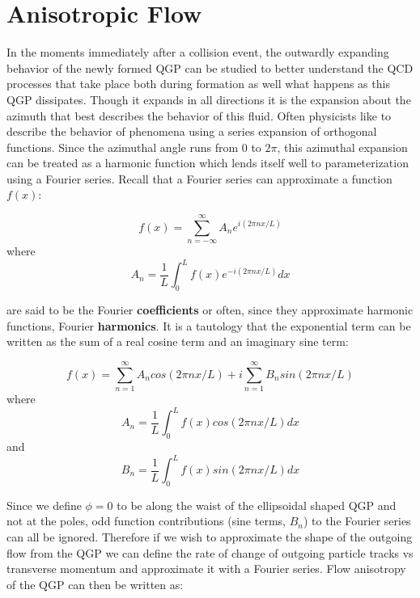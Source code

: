 
\chapter{Anisotropic Flow} %
\label{sect:flow}

In the moments immediately after a collision event, the outwardly expanding behavior of the newly formed QGP can be studied to better understand the QCD processes that take place both during formation as well what happens as this QGP dissipates. Though it expands in all directions it is the expansion about the azimuth that best describes the behavior of this fluid. Often physicists like to describe the behavior of phenomena using a series expansion of orthogonal functions. Since the azimuthal angle runs from $0$ to $2 \pi$, this azimuthal expansion can be treated as a harmonic function which lends itself well to parameterization using a Fourier series. Recall that a Fourier series can approximate a function $f(x)$:

\begin{equation}
f(x) = \sum^{\infty}_{n=-\infty} A_{n} e^{i(2 \pi n x / L)}
\end{equation}
where
\begin{equation}
A_{n} = \frac{1}{L} \int^{L}_{0} f(x) e^{-i(2 \pi n x / L)} dx
\end{equation}

are said to be the Fourier \textbf{coefficients} or often, since they approximate harmonic functions, Fourier \textbf{harmonics}. It is a tautology that the exponential term can be written as the sum of a real cosine term and an imaginary sine term:

\begin{equation}
f(x) = \sum^{\infty}_{n=1} A_{n} cos (2 \pi n x / L) + i \sum^{\infty}_{n=1} B_{n} sin (2 \pi n x / L)
\end{equation}
where
\begin{equation}
A_{n} = \frac{1}{L} \int^{L}_{0} f(x) cos (2 \pi n x / L) dx 
\end{equation}
and
\begin{equation}
B_{n} = \frac{1}{L} \int^{L}_{0} f(x) sin (2 \pi n x / L) dx 
\end{equation}

Since we define $\phi=0$ to be along the waist of the ellipsoidal shaped QGP and not at the poles, odd function contributions (sine terms, $B_{n}$) to the Fourier series can all be ignored. 
Therefore if we wish to approximate the shape of the outgoing flow from the QGP we can define the rate of change of outgoing particle tracks vs transverse momentum and approximate it with a Fourier series. Flow anisotropy of the QGP can then be written as:

